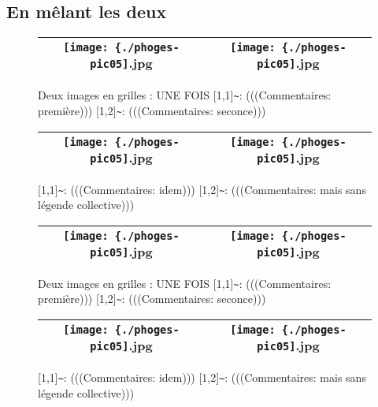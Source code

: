 \documentclass[12pt,twocolumn,french]{article}
\begin{document}
\subsection{En mêlant les deux}
%
  \begin{figure}[H]
    \label{phoges-pic05.jpg}
    \noindent \centering{}
    \begin{tabular}{|c|c|}
      \hline
          \texttt{[image: \{./phoges-pic05]}.jpg}
        &
          \texttt{[image: \{./phoges-pic05]}.jpg}
        \tabularnewline \hline
    \end{tabular}
    \vspace{2mm}
    \caption{
      Deux images en grilles : UNE FOIS
      [1,1]\texttt{\~{}}: 
      (((Commentaires: première)))
      [1,2]\texttt{\~{}}: 
      (((Commentaires: seconce)))
    }
  \end{figure}
  \begin{figure}[H]
    \label{phoges-pic05.jpg}
    \noindent \centering{}
    \begin{tabular}{|c|c|}
      \hline
          \texttt{[image: \{./phoges-pic05]}.jpg}
        &
          \texttt{[image: \{./phoges-pic05]}.jpg}
        \tabularnewline \hline
    \end{tabular}
    \vspace{2mm}
    \caption{
      [1,1]\texttt{\~{}}: 
      (((Commentaires: idem)))
      [1,2]\texttt{\~{}}: 
      (((Commentaires: mais sans légende collective)))
    }
  \end{figure}
  \begin{figure}[H]
    \label{phoges-pic05.jpg}
    \noindent \centering{}
    \begin{tabular}{|c|c|}
      \hline
          \texttt{[image: \{./phoges-pic05]}.jpg}
        &
          \texttt{[image: \{./phoges-pic05]}.jpg}
        \tabularnewline \hline
    \end{tabular}
    \vspace{2mm}
    \caption{
      Deux images en grilles : UNE FOIS
      [1,1]\texttt{\~{}}: 
      (((Commentaires: première)))
      [1,2]\texttt{\~{}}: 
      (((Commentaires: seconce)))
    }
  \end{figure}
  \begin{figure}[H]
    \label{phoges-pic05.jpg}
    \noindent \centering{}
    \begin{tabular}{|c|c|}
      \hline
          \texttt{[image: \{./phoges-pic05]}.jpg}
        &
          \texttt{[image: \{./phoges-pic05]}.jpg}
        \tabularnewline \hline
    \end{tabular}
    \vspace{2mm}
    \caption{
      [1,1]\texttt{\~{}}: 
      (((Commentaires: idem)))
      [1,2]\texttt{\~{}}: 
      (((Commentaires: mais sans légende collective)))
    }
  \end{figure}
\end{document}
